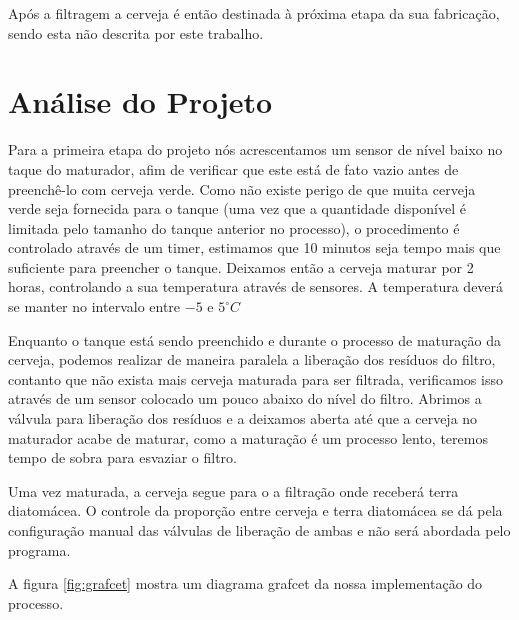 \documentclass[twoside,twocolumn, 12pt]{paper}
\begin{document}
	Após a filtragem a cerveja é então destinada à próxima etapa da sua fabricação, sendo esta não descrita por este trabalho.
	
	\section {Análise do Projeto}
	\label{sec:analise}
	Para a primeira etapa do projeto nós acrescentamos um sensor de nível baixo no taque do maturador, afim de verificar que este está de fato vazio antes de preenchê-lo com cerveja verde. Como não existe perigo de que muita cerveja verde seja fornecida para o tanque (uma vez que a quantidade disponível é limitada pelo tamanho do tanque anterior no processo), o procedimento é controlado através de um timer, estimamos que 10 minutos seja tempo mais que suficiente para preencher o tanque. Deixamos então a cerveja maturar por 2 horas, controlando a sua temperatura através de sensores. A temperatura deverá se manter no intervalo entre $-5$ e $5^\circ C$ 
	
	Enquanto o  tanque está sendo preenchido e durante o processo de maturação da cerveja, podemos realizar de maneira paralela a liberação dos resíduos do filtro, contanto que não exista mais cerveja maturada para ser filtrada, verificamos isso através de um sensor colocado um pouco abaixo do nível do filtro. Abrimos a válvula para liberação dos resíduos e a deixamos aberta até que a cerveja no maturador acabe de maturar, como a maturação é um processo lento, teremos tempo de sobra para esvaziar o filtro.
	
	Uma vez maturada, a cerveja segue para o a filtração onde receberá terra diatomácea. O controle da proporção entre cerveja e terra diatomácea se dá pela configuração manual das válvulas de liberação de ambas e não será abordada pelo programa.
	
	A figura \ref{fig:grafcet} mostra um diagrama grafcet da nossa implementação do processo.
	
\end{document}

